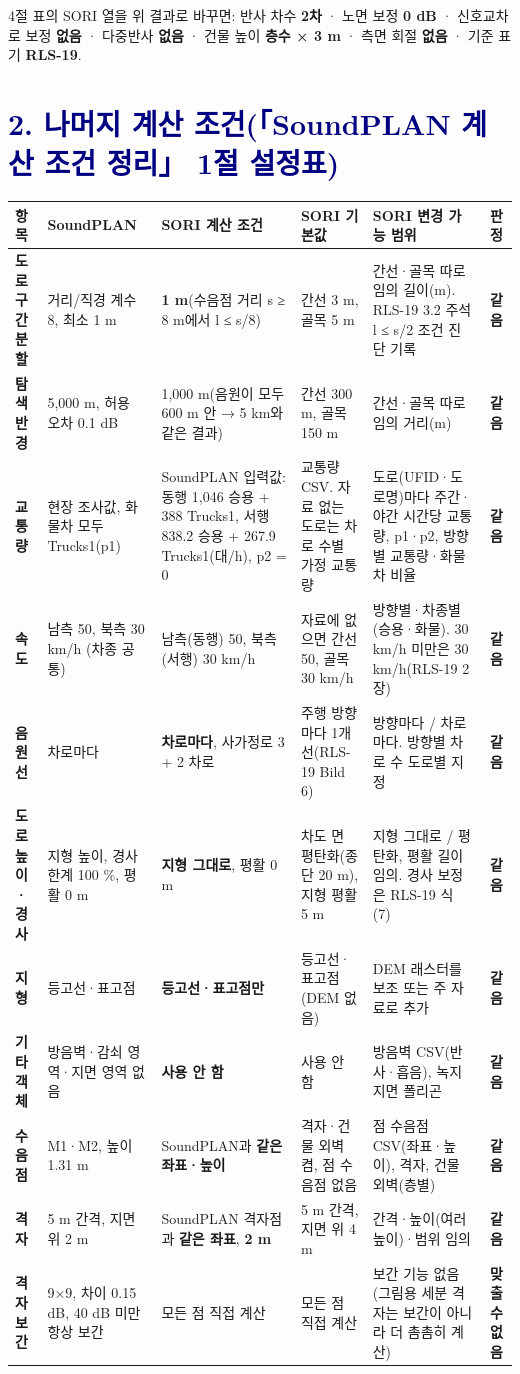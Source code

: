 \documentclass[10pt,a4paper]{article}
\newcommand{\hl}[1]{\textbf{#1}}
\newcommand{\ok}{\colorbox{okbg}{\textcolor{okfg}{\sffamily\bfseries\footnotesize 같음}}}
\newcommand{\eq}[1]{\colorbox{okbg}{\textcolor{okfg}{\sffamily\bfseries\footnotesize #1}}}
\newcommand{\nb}[1]{\colorbox{nbbg}{\textcolor{nbfg}{\sffamily\bfseries\footnotesize #1}}}
\newcommand{\sect}[1]{\Needspace{6\baselineskip}\section*{\textcolor{navy}{#1}}}
\begin{document}
\vspace{1mm}
{\footnotesize 4절 표의 SORI 열을 위 결과로 바꾸면: 반사 차수 \eq{2차} · 노면 보정 \eq{0 dB} · 신호교차로 보정 \eq{없음} · 다중반사 \eq{없음} ·
건물 높이 \eq{층수 × 3 m} · 측면 회절 \eq{없음} · 기준 표기 \eq{RLS-19}.}

\sect{2. 나머지 계산 조건(「SoundPLAN 계산 조건 정리」 1절 설정표)}

{\footnotesize
\renewcommand{\arraystretch}{1.25}
\begin{tabularx}{\linewidth}{@{}>{\bfseries}P{19mm}P{24mm}P{30mm}P{28mm}Lc@{}}
\toprule
{} 항목 & SoundPLAN & SORI 계산 조건 & SORI 기본값 & SORI 변경 가능 범위 & 판정 \\
\midrule
도로 구간 분할 & 거리/직경 계수 8, 최소 1 m & \hl{1 m}(수음점 거리 s ≥ 8 m에서 l ≤ s/8) & 간선 3 m, 골목 5 m &
  간선·골목 따로 임의 길이(m). RLS-19 3.2 주석 l ≤ s/2 조건 진단 기록 & \ok \\
탐색 반경 & 5,000 m, 허용 오차 0.1 dB & 1,000 m(음원이 모두 600 m 안 → 5 km와 같은 결과) & 간선 300 m, 골목 150 m &
  간선·골목 따로 임의 거리(m) & \ok \\
교통량 & 현장 조사값, 화물차 모두 Trucks1(p1) & SoundPLAN 입력값: 동행 1,046 승용 + 388 Trucks1, 서행 838.2 승용 + 267.9 Trucks1(대/h), p2 = 0 &
  교통량 CSV. 자료 없는 도로는 차로 수별 가정 교통량 &
  도로(UFID·도로명)마다 주간·야간 시간당 교통량, p1·p2, 방향별 교통량·화물차 비율 & \ok \\
속도 & 남측 50, 북측 30 km/h (차종 공통) & 남측(동행) 50, 북측(서행) 30 km/h & 자료에 없으면 간선 50, 골목 30 km/h &
  방향별·차종별(승용·화물). 30 km/h 미만은 30 km/h(RLS-19 2장) & \ok \\
음원선 & 차로마다 & \hl{차로마다}, 사가정로 3 + 2 차로 & 주행 방향마다 1개선(RLS-19 Bild 6) &
  방향마다 / 차로마다. 방향별 차로 수 도로별 지정 & \ok \\
도로 높이·경사 & 지형 높이, 경사 한계 100 \%, 평활 0 m & \hl{지형 그대로}, 평활 0 m & 차도 면 평탄화(종단 20 m), 지형 평활 5 m &
  지형 그대로 / 평탄화, 평활 길이 임의. 경사 보정은 RLS-19 식 (7) & \ok \\
지형 & 등고선·표고점 & \hl{등고선·표고점만} & 등고선·표고점(DEM 없음) &
  DEM 래스터를 보조 또는 주 자료로 추가 & \ok \\
기타 객체 & 방음벽·감쇠 영역·지면 영역 없음 & \hl{사용 안 함} & 사용 안 함 &
  방음벽 CSV(반사·흡음), 녹지 지면 폴리곤 & \ok \\
수음점 & M1·M2, 높이 1.31 m & SoundPLAN과 \hl{같은 좌표·높이} & 격자·건물 외벽 켬, 점 수음점 없음 &
  점 수음점 CSV(좌표·높이), 격자, 건물 외벽(층별) & \ok \\
격자 & 5 m 간격, 지면 위 2 m & SoundPLAN 격자점과 \hl{같은 좌표}, \hl{2 m} & 5 m 간격, 지면 위 4 m &
  간격·높이(여러 높이)·범위 임의 & \ok \\
격자 보간 & 9×9, 차이 0.15 dB, 40 dB 미만 항상 보간 & 모든 점 직접 계산 & 모든 점 직접 계산 &
  보간 기능 없음(그림용 세분 격자는 보간이 아니라 더 촘촘히 계산) & \nb{맞출 수 없음} \\
\bottomrule
\end{tabularx}}
\end{document}
